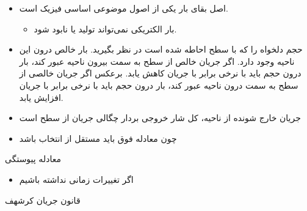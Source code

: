 \begin{ELunit}


\begin{itemize}
\tightlist
\item
  اصل بقای بار یکی از اصول موضوعی اساسی فیزیک است.

  \begin{itemize}
  \tightlist
  \item
    بار الکتریکی نمی‌تواند تولید یا نابود شود.
  \end{itemize}
\item
  حجم دلخواه  را که با سطح  احاطه شده است در نظر بگیرید. بار خالص  درون این ناحیه وجود دارد. اگر جریان خالص  از سطح به سمت بیرون ناحیه عبور کند، بار درون حجم باید با نرخی برابر با جریان کاهش یابد. برعکس اگر جریان خالصی از سطح به سمت درون ناحیه عبور کند، بار درون حجم باید با نرخی برابر با جریان افزایش یابد.
\item
  جریان خارج شونده از ناحیه، کل شار خروجی بردار چگالی جریان از سطح  است
\end{itemize}


\end{ELunit}

\begin{ELjoin}

\begin{itemize}
\tightlist
\item
  چون معادله فوق باید مستقل از انتخاب  باشد
\end{itemize}

\begin{ELimportant}{معادله پیوستگی}


\end{ELimportant}

\end{ELjoin}

\begin{ELjoin}

\begin{itemize}
\tightlist
\item
  اگر تغییرات زمانی نداشته باشیم
\end{itemize}


\begin{ELimportant}{قانون جریان کرشهف}


\end{ELimportant}

\end{ELjoin}

